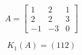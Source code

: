 \[
A=\left[
\begin{array}{ccc}
1 & 2 & 1 \\
2 & 2 & 3\\
-1 & -3 & 0
\end{array}\right]
\]
\bigskip

\[
  K_1(A)= \left(112
  \right)
\]
